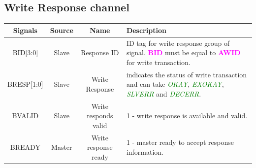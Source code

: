 \documentclass{article}
\newcommand{\AXISignals}[1]{\textbf{\textcolor{magenta}{#1}}}
\begin{document}
\subsection{Write Response channel}
\begin{table}[H]
    \begin{center}
        \begin{tabular}{c|c|c|p{9.5cm}}
            \textbf{Signals} & \textbf{Source} & \textbf{Name}        & \textbf{Description}                                                                                                                                                                            \\
            \hline
            BID[3:0]         & Slave           & Response ID          & ID tag for write response group of signal. \AXISignals{BID} must be equal to \AXISignals{AWID} for write transaction.                                                                           \\
            BRESP[1:0]       & Slave           & Write Response       & indicates the status of write transaction and can take \emph{\textcolor{green}{OKAY}}, \emph{\textcolor{green}{EXOKAY}}, \emph{\textcolor{green}{SLVERR}} and \emph{\textcolor{green}{DECERR}}. \\
            BVALID           & Slave           & Write responds valid & 1 - write response is available and valid.                                                                                                                                                      \\
            BREADY           & Master          & Write response ready & 1 - master ready to accept response information.                                                                                                                                                \\
        \end{tabular}
    \end{center}
\end{table}
\end{document}
